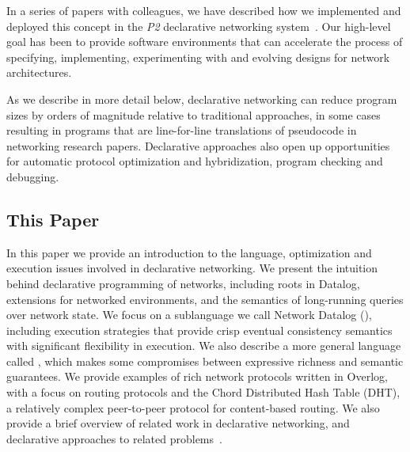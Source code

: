 In a series of papers with colleagues, we have described how we
implemented and deployed this concept in the {\em P2} declarative
networking system~\cite{declareOverlays}.  Our high-level goal has
been to provide software environments that can accelerate the process
of specifying, implementing, experimenting with and evolving designs
for network architectures.


As we describe in more detail below, declarative networking can reduce
program sizes by orders of magnitude relative to traditional
approaches, in some cases resulting in programs that are line-for-line
translations of pseudocode in networking research papers.  Declarative
approaches also open up opportunities for automatic protocol
optimization and hybridization, program checking and debugging.

\subsection{This Paper}
In this paper we provide an introduction to the language, optimization
and execution issues involved in declarative networking.  We present
the intuition behind declarative programming of networks, including
roots in Datalog, extensions for networked environments, and the
semantics of long-running queries over network state.  We focus on a
sublanguage we call Network Datalog (\Dlog), including execution
strategies that provide crisp eventual consistency semantics with
significant flexibility in execution.  We also describe a more general
language called \Overlog, which makes some compromises between
expressive richness and semantic guarantees.  We provide examples of
rich network protocols written in Overlog, with a focus on routing
protocols and the Chord Distributed Hash Table (DHT), a relatively
complex peer-to-peer protocol for content-based routing.  We also
provide a brief overview of related work in declarative networking,
and declarative approaches to related
problems~\cite{declareRoute,declareOverlays,declareNetworks}.

